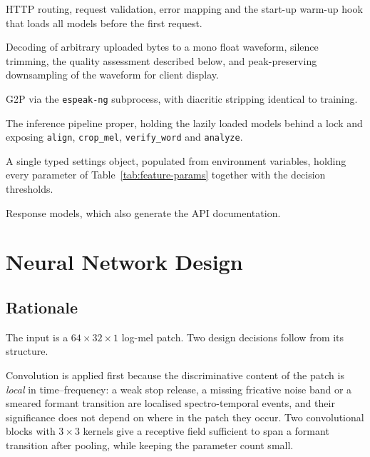 \begin{description}[leftmargin=0.6cm,style=nextline]
  \item[\texttt{main}] HTTP routing, request validation, error mapping and the
        start-up warm-up hook that loads all models before the first request.
  \item[\texttt{audio}] Decoding of arbitrary uploaded bytes to a mono float
        waveform, silence trimming, the quality assessment described below, and
        peak-preserving downsampling of the waveform for client display.
  \item[\texttt{phonemes}] G2P via the \texttt{espeak-ng} subprocess, with
        diacritic stripping identical to training.
  \item[\texttt{pipeline}] The inference pipeline proper, holding the lazily
        loaded models behind a lock and exposing \texttt{align},
        \texttt{crop\_mel}, \texttt{verify\_word} and \texttt{analyze}.
  \item[\texttt{config}] A single typed settings object, populated from
        environment variables, holding every parameter of
        Table~\ref{tab:feature-params} together with the decision thresholds.
  \item[\texttt{schemas}] Response models, which also generate the API
        documentation.
\end{description}

\section{Neural Network Design}
\label{sec:network-design}

\subsection{Rationale}

The input is a $64 \times 32 \times 1$ log-mel patch. Two design decisions
follow from its structure.

Convolution is applied first because the discriminative content of the patch is
\emph{local} in time--frequency: a weak stop release, a missing fricative noise
band or a smeared formant transition are localised spectro-temporal events, and
their significance does not depend on where in the patch they occur. Two
convolutional blocks with $3\times3$ kernels give a receptive field sufficient
to span a formant transition after pooling, while keeping the parameter count
small.

